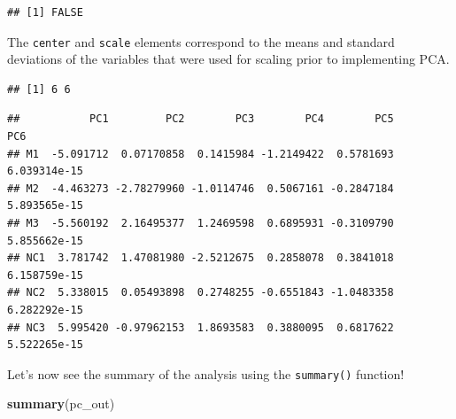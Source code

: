 \documentclass[
]{book}
\newenvironment{Shaded}{\begin{snugshade}}{\end{snugshade}}
\newcommand{\CommentTok}[1]{\textcolor[rgb]{0.56,0.35,0.01}{\textit{#1}}}
\newcommand{\FunctionTok}[1]{\textcolor[rgb]{0.13,0.29,0.53}{\textbf{#1}}}
\newcommand{\NormalTok}[1]{#1}
\newcommand{\SpecialCharTok}[1]{\textcolor[rgb]{0.81,0.36,0.00}{\textbf{#1}}}
\begin{document}
\begin{Shaded}
\end{Shaded}

\begin{verbatim}
## [1] FALSE
\end{verbatim}

The \texttt{center} and \texttt{scale} elements correspond to the means and standard deviations of the variables that were used for scaling prior to implementing PCA.

\begin{Shaded}
\end{Shaded}

\begin{verbatim}
## [1] 6 6
\end{verbatim}

\begin{Shaded}
\end{Shaded}

\begin{verbatim}
##           PC1         PC2        PC3        PC4        PC5          PC6
## M1  -5.091712  0.07170858  0.1415984 -1.2149422  0.5781693 6.039314e-15
## M2  -4.463273 -2.78279960 -1.0114746  0.5067161 -0.2847184 5.893565e-15
## M3  -5.560192  2.16495377  1.2469598  0.6895931 -0.3109790 5.855662e-15
## NC1  3.781742  1.47081980 -2.5212675  0.2858078  0.3841018 6.158759e-15
## NC2  5.338015  0.05493898  0.2748255 -0.6551843 -1.0483358 6.282292e-15
## NC3  5.995420 -0.97962153  1.8693583  0.3880095  0.6817622 5.522265e-15
\end{verbatim}

Let's now see the summary of the analysis using the \texttt{summary()} function!

\begin{Shaded}
\begin{Highlighting}[]
\FunctionTok{summary}\NormalTok{(pc\_out)}
\end{Highlighting}
\end{Shaded}
\end{document}
